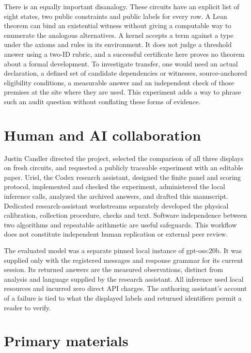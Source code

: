 \documentclass[12pt,letterpaper]{article}
\begin{document}
There is an equally important disanalogy. These circuits have an explicit list of eight states, two public constraints and public labels for every row. A Lean theorem can bind an existential witness without giving a computable way to enumerate the analogous alternatives. A kernel accepts a term against a type under the axioms and rules in its environment. It does not judge a threshold answer using a two-ID rubric, and a successful certificate here proves no theorem about a formal development. To investigate transfer, one would need an actual declaration, a defined set of candidate dependencies or witnesses, source-anchored eligibility conditions, a measurable answer and an independent check of those premises at the site where they are used. This experiment adds a way to phrase such an audit question without conflating these forms of evidence.

\clearpage\section{Human and AI collaboration}\label{collab}

Justin Candler directed the project, selected the comparison of all three displays on fresh circuits, and requested a publicly traceable experiment with an editable paper. Uriel, the Codex research assistant, designed the finite panel and scoring protocol, implemented and checked the experiment, administered the local inference calls, analyzed the archived answers, and drafted this manuscript. Dedicated research-assistant workstreams separately developed the physical calibration, collection procedure, checks and text. Software independence between two algorithms and repeatable arithmetic are useful safeguards. This workflow does not constitute independent human replication or external peer review.

The evaluated model was a separate pinned local instance of gpt-oss:20b. It was supplied only with the registered messages and response grammar for its current session. Its returned answers are the measured observations, distinct from analysis and language supplied by the research assistant. All inference used local resources and incurred zero direct API charges. The authoring assistant's account of a failure is tied to what the displayed labels and returned identifiers permit a reader to verify.

\section*{Primary materials}
\end{document}

